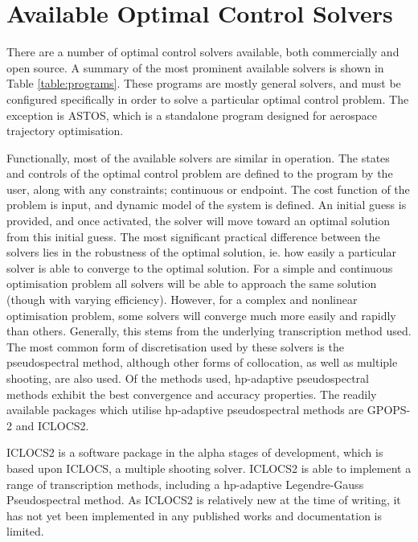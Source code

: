 \section{Available Optimal Control Solvers}\label{sec:optsolvers}

There are a number of optimal control solvers available, both commercially and open source. A summary of the most prominent available solvers is shown in Table \ref{table:programs}. These programs are mostly general solvers, and must be configured specifically in order to solve a particular optimal control problem. The exception is ASTOS\cite{astos}, which is a standalone program designed for aerospace trajectory optimisation.

Functionally, most of the available solvers are similar in operation. The states and controls of the optimal control problem are defined to the program by the user, along with any constraints; continuous or endpoint. The cost function of the problem is input, and dynamic model of the system is defined. An initial guess is provided, and once activated, the solver will move toward an optimal solution from this initial guess. 
The most significant practical difference between the solvers lies in the robustness of the optimal solution, ie. how easily a particular solver is able to converge to the optimal solution. For a simple and continuous optimisation problem all solvers will be able to approach the same solution (though with varying efficiency). However, for a complex and nonlinear optimisation problem, some solvers will converge much more easily and rapidly than others. Generally, this stems from the underlying transcription method used. 
The most common form of discretisation used by these solvers is the pseudospectral method, although other forms of collocation, as well as multiple shooting, are also used. Of the methods used, \textsf{hp}-adaptive pseudospectral methods exhibit the best convergence and accuracy properties\cite{Chai2015}. The readily available packages which utilise \textsf{hp}-adaptive pseudospectral methods are GPOPS-2\cite{Rao2010} and ICLOCS2\cite{iclocs}.

ICLOCS2 is a software package in the alpha stages of development, which is based upon ICLOCS, a multiple shooting solver\cite{iclocs}. ICLOCS2 is able to implement a range of transcription methods, including a \textsf{hp}-adaptive Legendre-Gauss Pseudospectral method\cite{iclocs}. As ICLOCS2 is relatively new at the time of writing, it has not yet been implemented in any published works and documentation is limited. 

